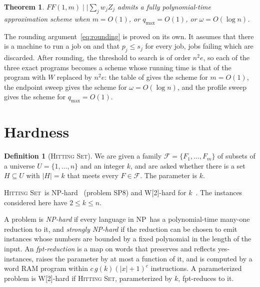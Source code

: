 \documentclass[11pt,a4paper]{article}
\newtheorem{theorem}{Theorem}
\theoremstyle{definition}
\newtheorem{definition}{Definition}
\theoremstyle{plain}
\newcommand{\FF}{FF(1,m)\mid\mid\textstyle\sum_j w_jZ_j}
\newcommand{\qmax}{q_{\max}}
\newcommand{\HS}{\textsc{Hitting Set}}
\newcommand{\NP}{\textnormal{\textsf{NP}}}
\newcommand{\Wtwo}{\textnormal{\textsf{W[2]}}}
\begin{document}
\setcounter{theorem}{4}
\begin{theorem}\label{thm:fptas}
$\FF$ admits a fully polynomial-time approximation scheme when $m=O(1)$, or $\qmax=O(1)$, or
$\omega=O(\log n)$.
\end{theorem}
The rounding argument~\eqref{eq:rounding} is proved on its own. It assumes that there is a
machine to run a job on and that $p_j\le s_j$ for every job, jobs failing which are discarded.
After rounding, the threshold to search is of order $n^2e$, so each of the three exact programs
becomes a scheme whose running time is that of the program with $W$ replaced by $n^2e$: the
table of  gives the scheme for $m=O(1)$,
the endpoint sweep gives the scheme for $\omega=O(\log n)$,
and the profile sweep gives the scheme for $\qmax=O(1)$.

\section{Hardness}\label{sec:hardness}

\begin{definition}[\HS]
We are given a family $\mathcal F=\{F_1,\ldots,F_m\}$ of subsets of a universe
$U=\{1,\ldots,n\}$ and an integer $k$, and are asked whether there is a set $H\subseteq U$ with
$|H|=k$ that meets every $F\in\mathcal F$. The parameter is $k$.
\end{definition}
\HS\ is \NP-hard~\cite{GJ79} (problem SP8) and \Wtwo-hard for $k$~\cite{DF99}. The instances
considered here have $2\le k\le n$.

A problem is \emph{\NP-hard} if every language in \NP\ has a polynomial-time many-one reduction
to it, and \emph{strongly \NP-hard} if the reduction can be chosen to emit instances whose
numbers are bounded by a fixed polynomial in the length of the input.
An \emph{fpt-reduction} is a map on words that preserves and reflects yes-instances, raises the
parameter by at most a function of it, and is computed by a word RAM program within
$c\,g(k)(|x|+1)^c$ instructions.
A parameterized problem is \Wtwo-hard if \HS, parameterized by $k$, fpt-reduces to it.
\end{document}
